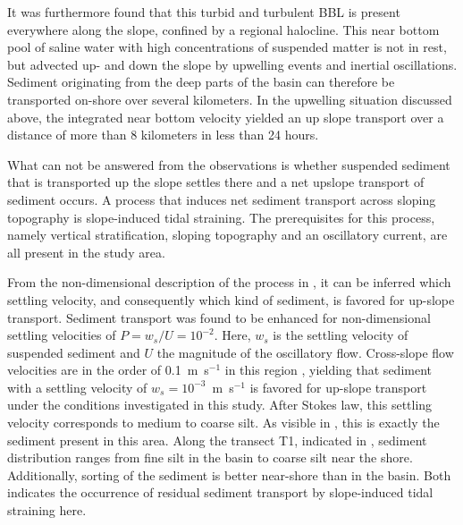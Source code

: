 It was furthermore found that this turbid and turbulent BBL is present 
everywhere 
along the slope, confined by a regional halocline. This near bottom pool of 
saline water with high concentrations of suspended matter is not in rest, but 
advected up- and down the slope by upwelling events and inertial oscillations. 
Sediment originating from the deep parts of the basin can therefore be 
transported on-shore over several kilometers. In the upwelling situation 
discussed above, the integrated near bottom velocity yielded an up slope 
transport over a distance of more than 8 kilometers in less than 24 hours. 

What can not be answered from the observations is whether suspended sediment 
that is transported up the slope settles there and a net upslope transport of 
sediment occurs. A process that induces net sediment transport across sloping 
topography is slope-induced tidal straining. The prerequisites for this 
process, namely vertical stratification, sloping topography and an oscillatory 
current, are all present in the study area. 

From the non-dimensional description of the process in \cite{schulzumlauf2016}, 
it can be inferred which settling velocity, and consequently which kind of 
sediment, 
is favored for up-slope transport. Sediment transport was found 
to be enhanced for non-dimensional settling velocities of $P= w_s \slash U = 
10^{-2}$. Here, $w_s$ is the settling velocity of suspended sediment and $U$ 
the magnitude of the oscillatory flow. Cross-slope flow velocities are in the 
order of 0.1~m~s$^{-1}$ in this region \citep[][]{lass1993}, yielding that 
sediment with a settling velocity of $w_s=10^{-3}$~m~s$^{-1}$ is favored for 
up-slope transport under the conditions investigated in this study. After 
Stokes law, this settling velocity corresponds to medium to coarse silt. As 
visible in , this is exactly the sediment present in this 
area. Along the transect T1, indicated in , sediment 
distribution ranges from fine silt in the basin to coarse silt near the shore. 
Additionally, sorting of the sediment is better near-shore than in the basin. 
Both indicates the occurrence of residual sediment transport by slope-induced 
tidal straining here.

